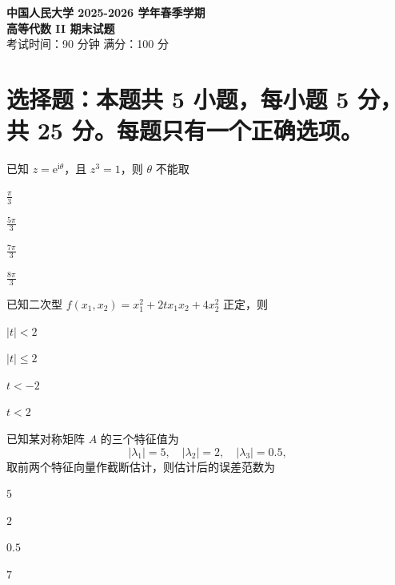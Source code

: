 \documentclass[11pt,a4paper]{exam-zh}
\begin{document}
\begin{center}
{\LARGE \textbf{中国人民大学 2025-2026 学年春季学期\\高等代数 II \quad 期末试题}}\\[1em]
{\large 考试时间：90 分钟 \quad 满分：100 分}\\[0.5em]
\end{center}

\section{选择题：本题共 5 小题，每小题 5 分，共 25 分。每题只有一个正确选项。}

\begin{question}
  已知 $z = \mathrm{e}^{\mathrm{i}\theta}$，且 $z^3 = 1$，则 $\theta$ 不能取
  \begin{choices}
    \item $\frac{\pi}{3}$
    \item $\frac{5\pi}{3}$
    \item $\frac{7\pi}{3}$
    \item $\frac{8\pi}{3}$
  \end{choices}
\end{question}

\begin{question}
  已知二次型 $f \left(x_1, x_2\right) = x_1^2 + 2t x_1 x_2 + 4 x_2^2$ 正定，则
  \begin{choices}
    \item $\left|t\right| < 2$
    \item $\left|t\right| \le 2$
    \item $t < -2$
    \item $t < 2$
  \end{choices}
\end{question}

\begin{question}
  已知某对称矩阵 $A$ 的三个特征值为 $$\left|\lambda_1\right| = 5, \quad \left|\lambda_2\right| = 2, \quad \left|\lambda_3\right| = 0.5,$$
  取前两个特征向量作截断估计，则估计后的误差范数为
  \begin{choices}
    \item $5$
    \item $2$
    \item $0.5$
    \item $7$
  \end{choices}
\end{question}
\end{document}
